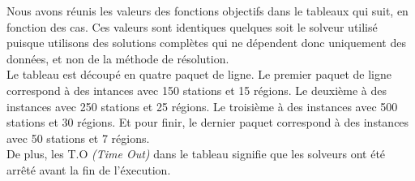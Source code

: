 \documentclass[a4paper, 10pt]{article}
\begin{document}
        Nous avons réunis les valeurs des fonctions objectifs dans le tableaux qui suit, en fonction des cas. Ces valeurs sont identiques quelques soit le solveur utilisé puisque utilisons des solutions complètes qui ne dépendent donc uniquement des données, et non de la méthode de résolution. \\
        Le tableau est découpé en quatre paquet de ligne. Le premier paquet de ligne correspond à des intances avec 150 stations et 15 régions. Le deuxième à des instances avec 250 stations et 25 régions. Le troisième à des instances avec 500 stations et 30 régions. Et pour finir, le dernier paquet correspond à des instances avec 50 stations et 7 régions. \\
        De plus, les \textcolor[gray]{0.6}{T.O} \textit{(Time Out)} dans le tableau signifie que les solveurs ont été arrêté avant la fin de l'éxecution.
\end{document}
